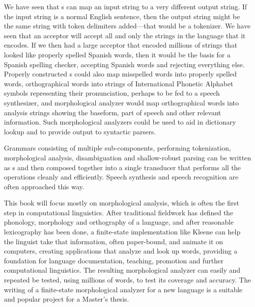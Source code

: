 We have seen that \fst{}s can map an input string to a very different output string.  If
the input string is a normal English sentence, then the output string might be the same
string with token delimiters added---that would be a tokenizer.  We have seen that an
acceptor will accept all and only the strings in the language that it encodes.  If we then
had a large acceptor that encoded millions of strings that looked like properly spelled Spanish words, then
it would be the basis for a Spanish spelling checker, accepting Spanish words and rejecting
everything else.  Properly constructed \fst{}s could also map misspelled words into properly
spelled words, orthographical words into
strings of International Phonetic Alphabet symbols representing their pronunciation,
perhaps to be fed to a speech synthesizer, and
morphological analyzer  would map orthographical words into analysis strings showing
the baseform, part of speech and other relevant information.  Such morphological analyzers
could be used to aid in dictionary lookup and to provide output to syntactic parsers.

Grammars consisting of multiple sub-components, performing tokenization, morphological
analysis, disambiguation and shallow-robust parsing can be written as \fst{}s and then
composed together into a single transducer that performs all the operations cleanly and
efficiently.  Speech synthesis and speech recognition are often approached this way.

This book will focus mostly on morphological analysis, which is often the first step in
computational linguistics.  After traditional fieldwork has defined the phonology,
morphology and orthography of a language, and after reasonable lexicography has been done,
a finite-state implementation like Kleene can help the linguist take that information, often paper-bound,
and animate it on
computers, creating
applications that analyze and look up words, providing a foundation for language
documentation, teaching, promotion and further computational linguistics.  The resulting
morphological analyzer can easily and repeated be tested, using millions of words, to
test its coverage and accuracy.  The writing of a finite-state
morphological
analyzer for a new language is a suitable and  popular project for a Master's thesis.



